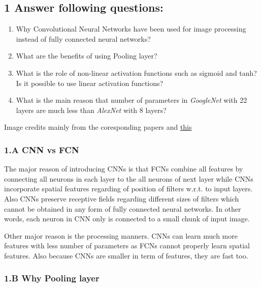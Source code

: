 \documentclass[11pt]{article}
\providecommand{\tightlist}{%
      \setlength{\itemsep}{0pt}\setlength{\parskip}{0pt}}
\begin{document}
    \hypertarget{answer-following-questions}{%
\subsection{1 Answer following
questions:}\label{answer-following-questions}}

\begin{enumerate}
\def\labelenumi{\arabic{enumi}.}
\tightlist
\item
  Why Convolutional Neural Networks have been used for image processing
  instead of fully connected neural networks?
\item
  What are the benefits of using Pooling layer?
\item
  What is the role of non-linear activation functions such as sigmoid
  and tanh? Is it possible to use linear activation functions?
\item
  What is the main reason that number of parameters in \emph{GoogleNet}
  with 22 layers are much less than \emph{AlexNet} with 8 layers?
\end{enumerate}

Image credits mainly from the coresponding papers and
\href{https://towardsdatascience.com/illustrated-10-cnn-architectures-95d78ace614d}{this}

    \hypertarget{a-cnn-vs-fcn}{%
\subsubsection{1.A CNN vs FCN}\label{a-cnn-vs-fcn}}

The major reason of introducing CNNs is that FCNs combine all features
by connecting all neurons in each layer to the all neurons of next layer
while CNNs incorporate spatial features regarding of position of filters
w.r.t. to input layers. Also CNNs preserve receptive fields regarding
different sizes of filters which cannot be obtained in any form of fully
connected neural networks. In other words, each neuron in CNN only is
connected to a small chunk of input image.

Other major reason is the processing manners. CNNs can learn much more
features with less number of parameters as FCNs cannot properly learn
spatial features. Also because CNNs are smaller in term of features,
they are fast too.

    \hypertarget{b-why-pooling-layer}{%
\subsubsection{1.B Why Pooling layer}\label{b-why-pooling-layer}}
\end{document}
